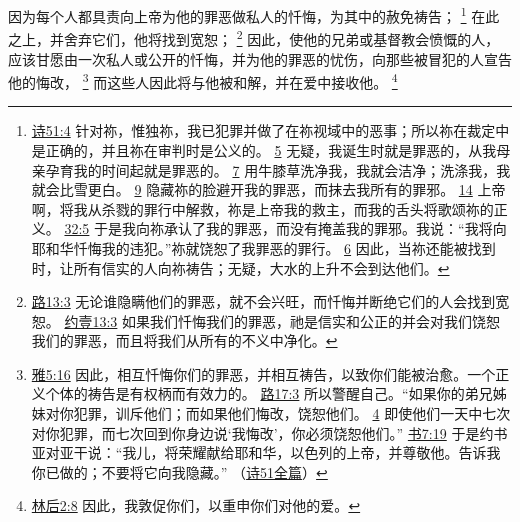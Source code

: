 \documentclass[12pt, a4paper, oneside]{ctexart}
\newcounter{parnum}[section]
\newcommand{\N}{%
   \noindent\refstepcounter{parnum}%
    \makebox[\parindent][l]{\textbf{\arabic{parnum}.}}}
\begin{document}
\N 因为每个人都具责向上帝为他的罪恶做私人的忏悔，为其中的赦免祷告；
	\footnote {
		\href{https://biblehub.com/psalms/51-4.htm}{诗51:4} 针对祢，惟独祢，我已犯罪并做了在祢视域中的恶事；所以祢在裁定中是正确的，并且祢在审判时是公义的。
		\href{https://biblehub.com/psalms/51-5.htm}{5} 无疑，我诞生时就是罪恶的，从我母亲孕育我的时间起就是罪恶的。
        \href{https://biblehub.com/psalms/51-7.htm}{7} 用牛膝草洗净我，我就会洁净；洗涤我，我就会比雪更白。
        \href{https://biblehub.com/psalms/51-9.htm}{9} 隐藏祢的脸避开我的罪恶，而抹去我所有的罪邪。
		\href{https://biblehub.com/psalms/51-14.htm}{14} 上帝啊，将我从杀戮的罪行中解救，祢是上帝我的救主，而我的舌头将歌颂祢的正义。
		\href{https://biblehub.com/psalms/32-5.htm}{32:5} 于是我向祢承认了我的罪恶，而没有掩盖我的罪邪。我说：“我将向耶和华忏悔我的违犯。”祢就饶恕了我罪恶的罪行。
		\href{https://biblehub.com/psalms/32-6.htm}{6} 因此，当祢还能被找到时，让所有信实的人向祢祷告；无疑，大水的上升不会到达他们。
	}
	在此之上，并舍弃它们，他将找到宽恕；
	\footnote {
		\href{https://biblehub.com/proverbs/28-13.htm}{路13:3} 无论谁隐瞒他们的罪恶，就不会兴旺，而忏悔并断绝它们的人会找到宽恕。
		\href{https://biblehub.com/1_john/1-9.htm}{约壹13:3} 如果我们忏悔我们的罪恶，祂是信实和公正的并会对我们饶恕我们的罪恶，而且将我们从所有的不义中净化。
	}
	因此，使他的兄弟或基督教会愤慨的人，应该甘愿由一次私人或公开的忏悔，并为他的罪恶的忧伤，向那些被冒犯的人宣告他的悔改，
	\footnote {
		\href{https://biblehub.com/james/5-16.htm}{雅5:16} 因此，相互忏悔你们的罪恶，并相互祷告，以致你们能被治愈。一个正义个体的祷告是有权柄而有效力的。
		\href{https://biblehub.com/luke/17-3.htm}{路17:3} 所以警醒自己。“如果你的弟兄姊妹对你犯罪，训斥他们；而如果他们悔改，饶恕他们。
		\href{https://biblehub.com/luke/17-4.htm}{4} 即使他们一天中七次对你犯罪，而七次回到你身边说‘我悔改’，你必须饶恕他们。”
		\href{https://biblehub.com/joshua/7-19.htm}{书7:19} 于是约书亚对亚干说：“我儿，将荣耀献给耶和华，以色列的上帝，并尊敬他。告诉我你已做的；不要将它向我隐藏。”
		（\href{https://biblehub.com/niv/psalms/51.htm}{诗51全篇}）
	}
	而这些人因此将与他被和解，并在爱中接收他。
	\footnote {
		\href{https://biblehub.com/2_corinthians/2-8.htm}{林后2:8} 因此，我敦促你们，以重申你们对他的爱。
	}
\end{document}
